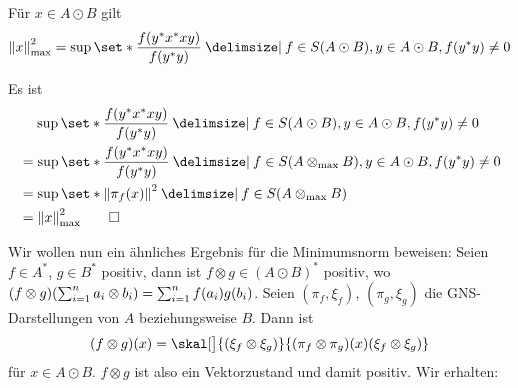 \begin{satz}[label=satz:119]
	Für $x \in A \odot B$ gilt
	\[
		\norm*{x}_{\max}^2 = \sup \set*{\frac{f(y^* x^* xy)}{f(y^* y)} \given f \in S(A \odot B) , y \in A \odot B, f(y^* y)\neq 0 }
	\]
\end{satz}
\begin{beweis}
	Es ist
	\begin{align}
		&\hspace{1.14em}\sup \set*{\frac{f(y^* x^* xy)}{f(y^* y)} \given f \in S(A \odot B) , y \in A \odot B, f(y^* y)\neq 0 }\\ 
		&=\sup \set*{\frac{f(y^* x^* xy)}{f(y^* y)} \given f \in S(A \tensormax B) , y \in A \odot B, f(y^* y)\neq 0 } \\
		&= \sup \set*{\norm*{\pi_f(x)}^2 \given f \in S(A \tensormax B)} \\
		&= \norm*{x}_{\max}^2 \qedhere
	\end{align}
\end{beweis}

Wir wollen nun ein ähnliches Ergebnis für die Minimumsnorm beweisen:
Seien $f \in A^*$, $g \in B^*$ positiv, dann ist $f \otimes g \in (A \odot B)^*$ positiv, wo $(f \otimes g) \enbrace*{\sum_{i=1}^{n} a_i \otimes b_i} = \sum_{i=1}^n f(a_i) g(b_i)$.
Seien $(\pi_f,\xi_f)$, $(\pi_g,\xi_g)$ die GNS-Darstellungen von $A$ beziehungsweise $B$.
Dann ist
\[
	(f \otimes g)(x) = \skal[\big]{ \enbrace*{\xi_f \otimes \xi_g} }{(\pi_f \otimes \pi_g)(x) \enbrace*{\xi_f \otimes \xi_g}}
\]
für $x \in A \odot B$.
$f \otimes g$ ist also ein Vektorzustand und damit positiv.
Wir erhalten:

